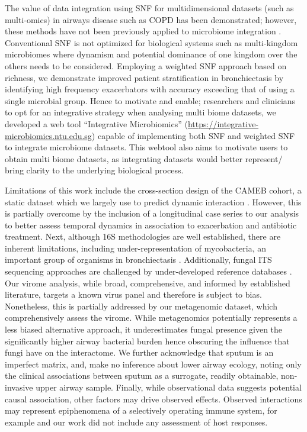 The value of data integration using SNF for multidimensional datasets (such as multi-omics) in airways disease such as COPD has been demonstrated; however, these methods have not been previously applied to microbiome integration \cite{Li2018}. Conventional SNF is not optimized for biological systems such as multi-kingdom microbiomes where dynamism and potential dominance of one kingdom over the others needs to be considered. Employing a weighted SNF approach based on richness, we demonstrate improved patient stratification in bronchiectasis by identifying high frequency exacerbators with accuracy exceeding that of using a single microbial group. Hence to motivate and enable; researchers and clinicians to opt for an integrative strategy when analysing multi biome datasets, we developed a web tool “Integrative Microbiomics” (\url{https://integrative-microbiomics.ntu.edu.sg}) capable of implementing both SNF and weighted SNF to integrate microbiome datasets. This webtool also aims to motivate users to obtain multi biome datasets, as integrating datasets would better represent/ bring clarity to the underlying biological process. 

Limitations of this work include the cross-section design of the CAMEB cohort, a static dataset which we largely use to predict dynamic interaction \cite{Aogain2019,Mac1800766}. However, this is partially overcome by the inclusion of a longitudinal case series to our analysis to better assess temporal dynamics in association to exacerbation and antibiotic treatment. Next, although 16S methodologies are well established, there are inherent limitations, including under-representation of mycobacteria, an important group of organisms in bronchiectasis \cite{Sulaiman2018}. Additionally, fungal ITS sequencing approaches are challenged by under-developed reference databases \cite{Ali2019}. Our virome analysis, while broad, comprehensive, and informed by established literature, targets a known virus panel and therefore is subject to bias. Nonetheless, this is partially addressed by our metagenomic dataset, which comprehensively assess the virome. While metagenomics potentially represents a less biased alternative approach, it underestimates fungal presence given the significantly higher airway bacterial burden hence obscuring the influence that fungi have on the interactome. We further acknowledge that sputum is an imperfect matrix, and, make no inference about lower airway ecology, noting only the clinical associations between sputum as a surrogate, readily obtainable, non-invasive upper airway sample. Finally, while observational data suggests potential causal association, other factors may drive observed effects. Observed interactions may represent epiphenomena of a selectively operating immune system, for example and our work did not include any assessment of host responses.